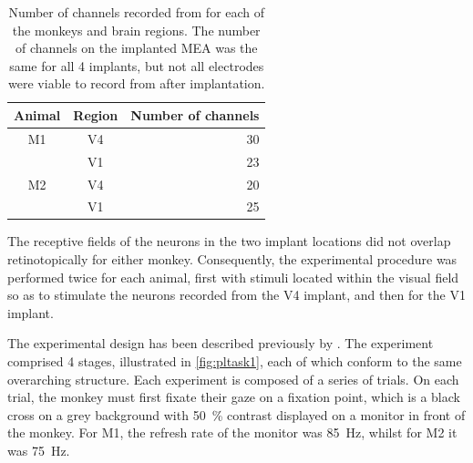 \begin{table}[hbtp]
\caption{Number of channels recorded from for each of the monkeys and brain regions.
The number of channels on the implanted \ac{MEA} was the same for all 4 implants, but not all electrodes were viable to record from after implantation.}
\label{tab:nchannels}
\begin{center}
\begin{tabular}{ccr}
\toprule
Animal  & Region    & Number of channels \\
\midrule
M1      & V4        & 30 \\
        & V1        & 23 \\
M2      & V4        & 20 \\
        & V1        & 25 \\
\bottomrule
\end{tabular}
\end{center}
\end{table}

The receptive fields of the neurons in the two implant locations did not overlap retinotopically for either monkey.
Consequently, the experimental procedure was performed twice for each animal, first with stimuli located within the visual field so as to stimulate the neurons recorded from the \ac{V4} implant, and then for the \ac{V1} implant.

The experimental design has been described previously by \cite{Chen2013,Chen2014}.
The experiment comprised 4 stages, illustrated in \autoref{fig:pltask1}, each of which conform to the same overarching structure.
Each experiment is composed of a series of trials.
On each trial, the monkey must first fixate their gaze on a fixation point, which is a black cross on a grey background with \SI{50}{\percent} contrast displayed on a monitor in front of the monkey.
For \ac{M1}, the refresh rate of the monitor was \SI{85}{Hz}, whilst for \ac{M2} it was \SI{75}{Hz}.


